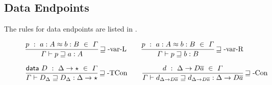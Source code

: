 \subsection{Data Endpoints}

The rules for data endpoints are listed in .

\begin{figure}

\begin{align*}
  \frac{
  p\ :\ a:A\approx b:B\ \in\ \varGamma
}{
  \varGamma\vdash p\sqsupseteq a:A
  }\operatorname{\sqsupseteq-var-L} \quad & \quad \frac{
    p\ :\ a:A\approx b:B\ \in\ \varGamma
  }{
    \varGamma\vdash p\sqsupseteq b:B
    }\operatorname{\sqsupseteq-var-R} \\
\end{align*}

\begin{align*}
\frac{\mathsf{data}\ D\ :\ \Delta\rightarrow\star\ \in\ \varGamma
}{
\varGamma\vdash D_{\Delta}\sqsupseteq D_{\Delta}:\Delta\rightarrow\star
}\operatorname{\sqsupseteq-TCon} \quad & \quad \frac{
d\ :\ \Delta\rightarrow D\overline{a}\ \in\ \varGamma
}{
\varGamma\vdash d_{\Delta\rightarrow D\overline{a}}\sqsupseteq d_{\Delta\rightarrow D\overline{a}}:\Delta\rightarrow D\overline{a}
}\operatorname{\sqsupseteq-Con}\\
\end{align*}


\end{figure}
